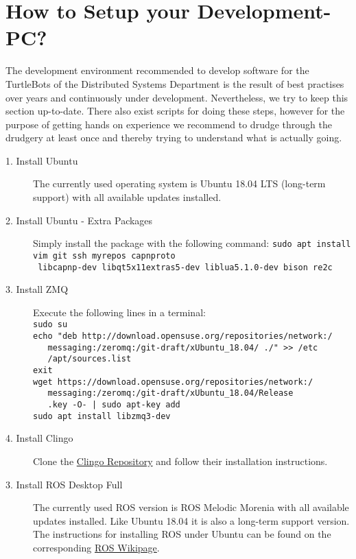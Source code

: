 \section{How to Setup your Development-PC?}
\label{sec:SetupPC}

The development environment recommended to develop software for the TurtleBots of the Distributed Systems Department is the result of best practises over years and continuously under development. Nevertheless, we try to keep this section up-to-date. There also exist scripts for doing these steps, however for the purpose of getting hands on experience we recommend to drudge through the drudgery at least once and thereby trying to understand what is actually going.

\begin{description}
	\item[1. Install Ubuntu] The currently used operating system is Ubuntu 18.04 LTS (long-term support) with all available updates installed.
	\item[2. Install Ubuntu - Extra Packages] Simply install the package with the following command: \verb#sudo apt install vim git ssh myrepos capnproto#\\\verb# libcapnp-dev libqt5x11extras5-dev liblua5.1.0-dev bison re2c#
	\item[3. Install ZMQ] Execute the following lines in a terminal:\\
\verb#sudo su#\\
\verb#echo "deb http://download.opensuse.org/repositories/network:/#\\\verb#   messaging:/zeromq:/git-draft/xUbuntu_18.04/ ./" >> /etc#\\\verb#   /apt/sources.list#\\
\verb#exit#\\
\verb#wget https://download.opensuse.org/repositories/network:/#\\\verb#   messaging:/zeromq:/git-draft/xUbuntu_18.04/Release#\\\verb#   .key -O- | sudo apt-key add#\\
\verb#sudo apt install libzmq3-dev#
	\item[4. Install Clingo] Clone the \href{https://github.com/potassco/clingo}{Clingo Repository} and follow their installation instructions.
	\item[3. Install ROS Desktop Full] The currently used ROS version is ROS Melodic Morenia with all available updates installed. Like Ubuntu 18.04 it is also a long-term support version. The instructions for installing ROS under Ubuntu can be found on the corresponding \href{http://wiki.ros.org/melodic/Installation/Ubuntu}{ROS Wikipage}.

\end{description}
